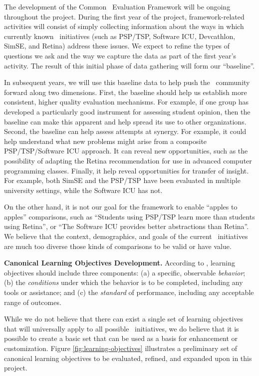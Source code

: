 The development of the Common \eCT\ Evaluation Framework will be ongoing
throughout the project.  During the first year of the project,
framework-related activities will consist of simply collecting information
about the ways in which currently known \eCT\ initiatives (such as PSP/TSP,
Software ICU, Devcathlon, SimSE, and Retina) address these issues.   We expect to 
refine the types of questions we ask and the way we capture the data as
part of the first year's activity. The result of this initial phase of data
gathering will form our ``baseline''. 

In subsequent years, we will use this baseline data to help push the \eCT\
community forward along two dimensions. First, the baseline should help us
establish more consistent, higher quality evaluation mechanisms. For
example, if one group has developed a particularly good instrument for
assessing student opinion, then the baseline can make this apparent and
help spread its use to other organizations.  Second, the baseline can
help assess attempts at synergy.  For example, it could help understand what 
new problems might arise from a composite PSP/TSP/Software ICU approach. 
It can reveal new opportunities, such as the possibility of adapting the 
Retina recommendation for use in advanced computer programming classes. 
Finally, it help reveal opportunities for transfer of insight. For example, 
both SimSE and the PSP/TSP have been evaluated in multiple university settings, 
while the Software ICU has not. 

On the other hand, it is not our goal for the framework to enable ``apples
to apples'' comparisons, such as ``Students using PSP/TSP learn more than
students using Retina'', or ``The Software ICU provides better abstractions
than Retina''.  We believe that the context, demographics, and goals of the
current \eCT\ initiatives are much too diverse those kinds of comparisons
to be valid or have value.

{\bf Canonical Learning Objectives Development.}  According to
\cite{Mager62}, learning objectives should include three components: (a) a
specific, observable {\em behavior}; (b) the {\em conditions} under which
the behavior is to be completed, including any tools or assistance; and (c)
the {\em standard} of performance, including any acceptable range of
outcomes.

While we do not believe that there can exist a single set of learning
objectives that will universally apply to all possible \eCT\ initiatives,
we do believe that it is possible to create a basic set that can be used as
a basis for enhancement or customization.  Figure
\ref{fig:learning-objectives} illustrates a preliminary set of canonical
learning objectives to be evaluated, refined, and expanded upon in this project. 

